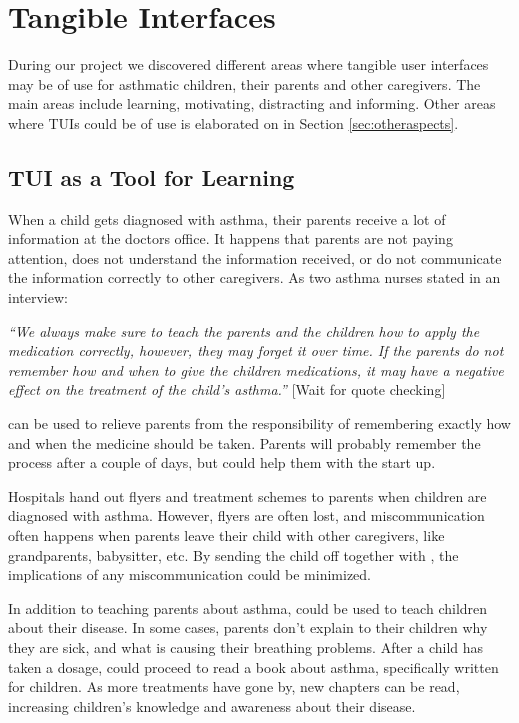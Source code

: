 \section{Tangible Interfaces}
\label{sec:resultstui}
During our project we discovered different areas where tangible user interfaces may be of use for asthmatic children, their parents and other caregivers. The main areas include learning, motivating, distracting and informing. Other areas where TUIs could be of use is elaborated on in Section \ref{sec:otheraspects}.


\subsection{TUI as a Tool for Learning}

When a child gets diagnosed with asthma, their parents receive a lot of information at the doctors office. It happens that parents are not paying attention, does not understand the information received, or do not communicate the information correctly to other caregivers. As two asthma nurses stated in an interview: 

\textit{``We always make sure to teach the parents and the children how to apply the medication correctly, however, they may forget it over time. If the parents do not remember how and when to give the children medications, it may have a negative effect on the treatment of the child's asthma.''}
[Wait for quote checking]

\buddy{} can be used to relieve parents from the responsibility of remembering exactly how and when the medicine should be taken. Parents will probably remember the process after a couple of days, but \buddy{} could help them with the start up. 

Hospitals hand out flyers and treatment schemes to parents when children are diagnosed with asthma. However, flyers are often lost, and miscommunication often happens when parents leave their child with other caregivers, like grandparents, babysitter, etc. By sending the child off together with \buddy{}, the implications of any miscommunication could be minimized.    

In addition to teaching parents about asthma, \buddy{} could be used to teach children about their disease. In some cases, parents don't explain to their children why they are sick, and what is causing their breathing problems. After a child has taken a dosage, \buddy{} could proceed to read a book about asthma, specifically written for children. As more treatments have gone by, new chapters can be read, increasing children's knowledge and awareness about their disease.   

